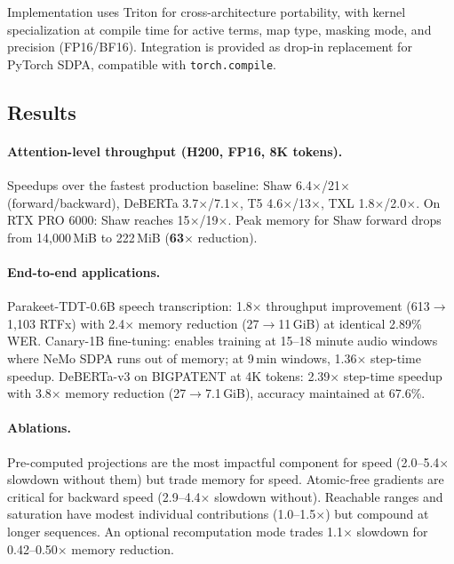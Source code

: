 \documentclass[11pt,a4paper]{article}
\begin{document}
Implementation uses Triton for cross-architecture portability, with kernel specialization at compile time for active terms, map type, masking mode, and precision (FP16/BF16). Integration is provided as drop-in replacement for PyTorch SDPA, compatible with \texttt{torch.compile}.

\subsection{Results}
\paragraph{Attention-level throughput (H200, FP16, 8K tokens).}
Speedups over the fastest production baseline: Shaw 6.4$\times$/21$\times$ (forward/backward), DeBERTa 3.7$\times$/7.1$\times$, T5 4.6$\times$/13$\times$, TXL 1.8$\times$/2.0$\times$. On RTX PRO 6000: Shaw reaches 15$\times$/19$\times$. Peak memory for Shaw forward drops from 14{,}000\,MiB to 222\,MiB (\textbf{63$\times$} reduction).

\paragraph{End-to-end applications.}
Parakeet-TDT-0.6B speech transcription: 1.8$\times$ throughput improvement (613$\to$1{,}103 RTFx) with 2.4$\times$ memory reduction (27$\to$11\,GiB) at identical 2.89\% WER. Canary-1B fine-tuning: enables training at 15--18 minute audio windows where NeMo SDPA runs out of memory; at 9\,min windows, 1.36$\times$ step-time speedup. DeBERTa-v3 on BIGPATENT at 4K tokens: 2.39$\times$ step-time speedup with 3.8$\times$ memory reduction (27$\to$7.1\,GiB), accuracy maintained at 67.6\%.

\paragraph{Ablations.}
Pre-computed projections are the most impactful component for speed (2.0--5.4$\times$ slowdown without them) but trade memory for speed. Atomic-free gradients are critical for backward speed (2.9--4.4$\times$ slowdown without). Reachable ranges and saturation have modest individual contributions (1.0--1.5$\times$) but compound at longer sequences. An optional recomputation mode trades 1.1$\times$ slowdown for 0.42--0.50$\times$ memory reduction.
\end{document}
